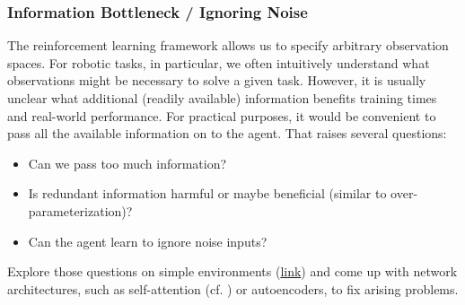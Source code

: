 \documentclass[a4paper]{article}
\begin{document}
\subsubsection{Information Bottleneck / Ignoring Noise}
The reinforcement learning framework allows us to specify arbitrary observation spaces.
For robotic tasks, in particular, we often intuitively understand what observations might be necessary to solve a given task.
However, it is usually unclear what additional (readily available) information benefits training times and real-world performance.
For practical purposes, it would be convenient to pass all the available information on to the agent.
That raises several questions:
\begin{itemize}
  \item Can we pass too much information?
  \item Is redundant information harmful or maybe beneficial (similar to over-parameterization)?
  \item Can the agent learn to ignore noise inputs?
\end{itemize}
Explore those questions on simple environments (\href{https://gymnasium.farama.org/environments/mujoco/}{link}) and come up with network architectures, such as self-attention (cf. \citet{Tang2020}) or autoencoders, to fix arising problems.


\end{document}

